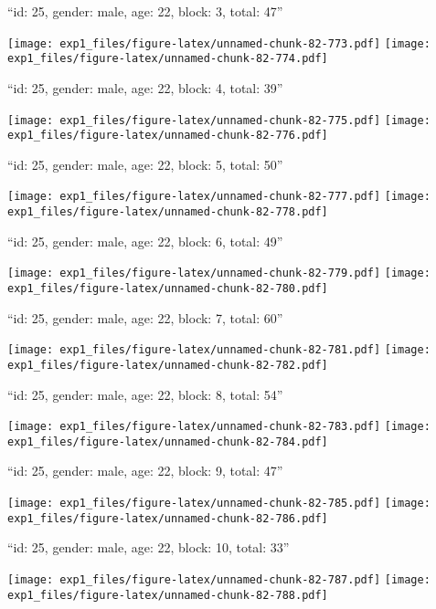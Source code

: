 \documentclass[11pt,,]{article}
\begin{document}
\newpage
[1] 

``id: 25, gender: male, age: 22, block: 3, total: 47''

\texttt{[image: exp1\_files/figure-latex/unnamed-chunk-82-773.pdf]}
\texttt{[image: exp1\_files/figure-latex/unnamed-chunk-82-774.pdf]}

\newpage
[1] 

``id: 25, gender: male, age: 22, block: 4, total: 39''

\texttt{[image: exp1\_files/figure-latex/unnamed-chunk-82-775.pdf]}
\texttt{[image: exp1\_files/figure-latex/unnamed-chunk-82-776.pdf]}

\newpage
[1] 

``id: 25, gender: male, age: 22, block: 5, total: 50''

\texttt{[image: exp1\_files/figure-latex/unnamed-chunk-82-777.pdf]}
\texttt{[image: exp1\_files/figure-latex/unnamed-chunk-82-778.pdf]}

\newpage
[1] 

``id: 25, gender: male, age: 22, block: 6, total: 49''

\texttt{[image: exp1\_files/figure-latex/unnamed-chunk-82-779.pdf]}
\texttt{[image: exp1\_files/figure-latex/unnamed-chunk-82-780.pdf]}

\newpage
[1] 

``id: 25, gender: male, age: 22, block: 7, total: 60''

\texttt{[image: exp1\_files/figure-latex/unnamed-chunk-82-781.pdf]}
\texttt{[image: exp1\_files/figure-latex/unnamed-chunk-82-782.pdf]}

\newpage
[1] 

``id: 25, gender: male, age: 22, block: 8, total: 54''

\texttt{[image: exp1\_files/figure-latex/unnamed-chunk-82-783.pdf]}
\texttt{[image: exp1\_files/figure-latex/unnamed-chunk-82-784.pdf]}

\newpage
[1] 

``id: 25, gender: male, age: 22, block: 9, total: 47''

\texttt{[image: exp1\_files/figure-latex/unnamed-chunk-82-785.pdf]}
\texttt{[image: exp1\_files/figure-latex/unnamed-chunk-82-786.pdf]}

\newpage
[1] 

``id: 25, gender: male, age: 22, block: 10, total: 33''

\texttt{[image: exp1\_files/figure-latex/unnamed-chunk-82-787.pdf]}
\texttt{[image: exp1\_files/figure-latex/unnamed-chunk-82-788.pdf]}
\end{document}
